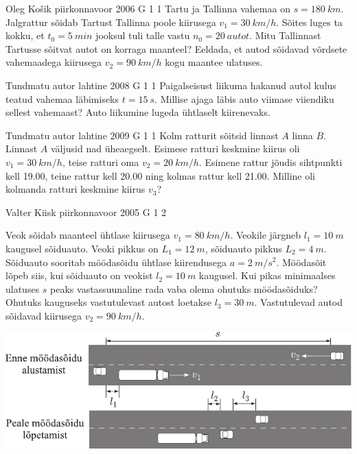 \documentclass[11pt, twoside]{article}
\begin{document}
{%
{Oleg Košik} %
{piirkonnavoor} %
{2006} %
{G 1} %
{1} %
{
\ifStatement
Tartu ja Tallinna vahemaa on $s = \SI{180}{km}$. Jalgrattur sõidab Tartust Tallinna poole kiirusega $v_1 = \SI{30}{km/h}$. Sõites luges ta kokku, et $t_0 = \SI{5}{min}$ jooksul tuli talle vastu $n_0 = \SI{20}{autot}$. Mitu Tallinnast Tartusse sõitvat autot on korraga maanteel? Eeldada, et autod sõidavad võrdsete vahemaadega kiirusega $v_2 = \SI{90}{km/h}$ kogu maantee ulatuses.
\fi
}

{Tundmatu autor} %
{lahtine} %
{2008} %
{G 1} %
{1} %
{
\ifStatement
Paigalseisust liikuma hakanud autol kulus teatud vahemaa läbimiseks $t = \SI{15}{s}$. Millise ajaga läbis auto viimase viiendiku sellest vahemaast? Auto liikumine lugeda ühtlaselt kiirenevaks.
\fi
}

{Tundmatu autor} %
{lahtine} %
{2009} %
{G 1} %
{1} %
{
\ifStatement
Kolm ratturit sõitsid linnast $A$ linna $B$. Linnast $A$ väljusid nad üheaegselt. Esimese ratturi keskmine kiirus oli $v_1 = \SI{30}{km/h}$, teise ratturi oma $v_2 = \SI{20}{km/h}$. Esimene rattur jõudis sihtpunkti kell 19.00, teine rattur kell 20.00 ning kolmas rattur kell 21.00. Milline oli kolmanda ratturi keskmine kiirus $v_3$?
\fi
}

{Valter Kiisk} %
{piirkonnavoor} %
{2005} %
{G 1} %
{2} %
{
\ifStatement
Veok sõidab maanteel ühtlase kiirusega $v_1 = \SI{80}{km/h}$. Veokile järgneb $l_1 = \SI{10}{m}$ kaugusel sõiduauto. Veoki pikkus on $L_1 = \SI{12}{m}$, sõiduauto pikkus $L_2 = \SI{4}{m}$. Sõiduauto sooritab möödasõidu ühtlase kiirendusega $a = \SI{2}{m/s^2}$. Möödasõit lõpeb siis, kui sõiduauto on veokist $l_2 = \SI{10}{m}$ kaugusel. Kui pikas minimaalses ulatuses $s$ peaks vastassuunaline rada vaba olema ohutuks möödasõiduks? Ohutuks kauguseks vastutulevast autost loetakse $l_3 = \SI{30}{m}$. Vastutulevad autod sõidavad kiirusega $v_2 = \SI{90}{km/h}$.

\begin{center}
	\includegraphics[width=\linewidth]{2005-v2g-01-yl}
\end{center}
\fi
}

}
\end{document}
